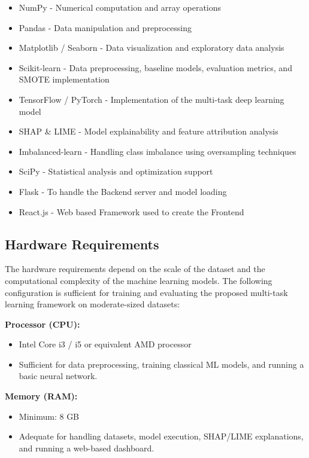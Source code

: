\begin{itemize}
    \item NumPy - Numerical computation and array operations
    \item Pandas - Data manipulation and preprocessing
    \item Matplotlib / Seaborn - Data visualization and exploratory data analysis
    \item Scikit-learn - Data preprocessing, baseline models, evaluation metrics, and SMOTE implementation
    \item TensorFlow / PyTorch - Implementation of the multi-task deep learning model
    \item SHAP \& LIME - Model explainability and feature attribution analysis
    \item Imbalanced-learn - Handling class imbalance using oversampling techniques
    \item SciPy - Statistical analysis and optimization support
    \item Flask - To handle the Backend server and model loading
    \item React.js - Web based Framework used to create the Frontend
\end{itemize}

\subsection{Hardware Requirements}

The hardware requirements depend on the scale of the dataset and the computational complexity of the machine learning models. The following configuration is sufficient for training and evaluating the proposed multi-task learning framework on moderate-sized datasets:

\textbf{Processor (CPU):}
\begin{itemize}
    \item Intel Core i3 / i5 or equivalent AMD processor
    \item Sufficient for data preprocessing, training classical ML models, and running a basic neural network.
\end{itemize}

\textbf{Memory (RAM):}
\begin{itemize}
    \item Minimum: 8 GB
    \item Adequate for handling datasets, model execution, SHAP/LIME explanations, and running a web-based dashboard.
\end{itemize}

